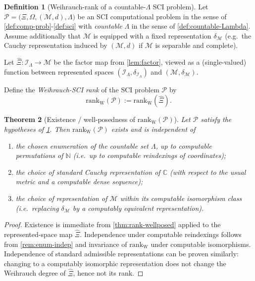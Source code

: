 \documentclass{lmcs} %
\theoremstyle{plain}
\theoremstyle{plain}
\newtheorem{theorem}{Theorem}[section]
\theoremstyle{definition}
\newtheorem{definition}[theorem]{Definition}
\theoremstyle{remark}
\theoremstyle{definition}
\theoremstyle{remark}
\numberwithin{equation}{section}
\newcommand{\N}{\mathbb{N}}
\newcommand{\C}{\mathbb{C}}
\begin{document}
\begin{definition}[Weihrauch-rank of a countable-$\Lambda$ SCI problem]\label{def:rank-of-SCIproblem}
Let $\mathcal{P}=\bigl( \Xi,\Omega,(\mathcal{M},d),\Lambda \bigr)$ be an SCI computational problem in the sense of \cref{def:comp-prob}-\cref{def:sci}
with \textit{countable} $\Lambda$ in the sense of \cref{def:countable-Lambda}.
Assume additionally that $\mathcal{M}$ is equipped with a fixed representation $\delta_{\mathcal{M}}$
(e.g.\ the Cauchy representation induced by $(\mathcal{M},d)$ if $\mathcal{M}$ is separable and complete).

Let $\widehat{\Xi}:\mathcal{I}_\Lambda\to\mathcal{M}$ be the factor map from \cref{lem:factor},
viewed as a (single-valued) function between represented spaces
$(\mathcal{I}_\Lambda,\delta_{\mathcal{I}_\Lambda})$ and $(\mathcal{M},\delta_{\mathcal{M}})$.

Define the \textit{Weihrauch-SCI rank} of the SCI problem $\mathcal{P}$ by
\[
\mathrm{rank}_{\mathrm{W}}(\mathcal{P})
:=\mathrm{rank}_{\mathrm{W}}(\widehat{\Xi}).
\]
\end{definition}

\begin{theorem}[Existence / well-posedness of $\mathrm{rank}_{\mathrm{W}}(\mathcal{P})$]\label{thm:rank-P}
Let $\mathcal{P}$ satisfy the hypotheses of \cref{def:rank-of-SCIproblem}.
Then $\mathrm{rank}_{\mathrm{W}}(\mathcal{P})$ exists and is independent of
\begin{enumerate}
\item the chosen enumeration of the countable set $\Lambda$, \textit{up to computable permutations
of $\N$} (i.e.\ up to computable reindexings of coordinates);
\item the choice of standard \textit{Cauchy} representation of $\C$
(with respect to the usual metric and a computable dense sequence);
\item the choice of representation of $\mathcal{M}$ \textit{within its computable isomorphism class}
(i.e.\ replacing $\delta_\mathcal{M}$ by a computably equivalent representation).
\end{enumerate}
\end{theorem}

\begin{proof}
Existence is immediate from \cref{thm:rank-wellposed} applied to the represented-space map $\widehat{\Xi}$.
Independence under computable reindexings follows from \cref{rem:enum-indep} and invariance
of $\mathrm{rank}_{\mathrm{W}}$ under computable isomorphisms.
Independence of standard admissible representations can be proven similarly: changing to a computably isomorphic representation
does not change the Weihrauch degree of $\widehat{\Xi}$, hence not its rank.
\end{proof}
\end{document}
